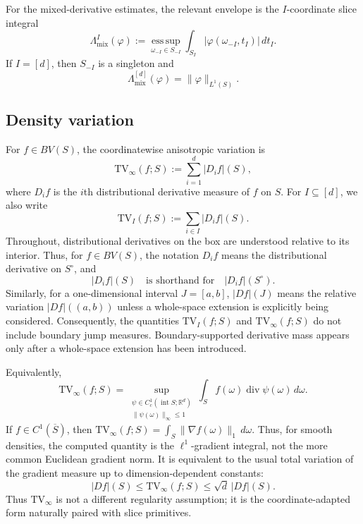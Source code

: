 \documentclass[11pt,letterpaper]{article}
\theoremstyle{definition}
\theoremstyle{remark}
\newcommand{\TV}{\mathrm{TV}}
\begin{document}
For the mixed-derivative estimates, the relevant envelope is the
$I$-coordinate slice integral
$$
\Lambda_{\mathrm{mix}}^I(\varphi)
:=
\operatorname*{ess\,sup}_{\omega_{-I}\in S_{-I}}
\int_{S_I}|\varphi(\omega_{-I},t_I)|\,dt_I .
$$
If $I=[d]$, then $S_{-I}$ is a singleton and
$$
\Lambda_{\mathrm{mix}}^{[d]}(\varphi)=\|\varphi\|_{L^1(S)}.
$$



\subsection{Density variation } 
\label{subsec:density_variation}
  

For $f\in BV(S)$, the coordinatewise anisotropic variation is
\begin{equation}
\label{eq:def_anisotropic_tv}
\TV_\infty(f;S):=\sum_{i=1}^d |D_i f|(S),
\end{equation}
where $D_i f$ is the $i$th distributional derivative measure of $f$ on $S$.
For $I\subseteq[d]$, we also write
$$
\TV_I(f;S):=\sum_{i\in I}|D_i f|(S).
$$
Throughout, distributional derivatives on the box are understood relative to
its interior. Thus, for $f\in BV(S)$, the notation $D_i f$ means the
distributional derivative on $S^\circ$, and
$$
|D_i f|(S)
\quad\text{is shorthand for}\quad
|D_i f|(S^\circ).
$$
Similarly, for a one-dimensional interval $J=[a,b]$,
$|Df|(J)$ means the relative variation $|Df|((a,b))$ unless a whole-space
extension is explicitly being considered. Consequently, the quantities
$\TV_I(f;S)$ and $\TV_\infty(f;S)$ do not include boundary jump measures.
Boundary-supported derivative mass appears only after a whole-space extension
has been introduced.

Equivalently,
$$
\TV_\infty(f;S)
=
\sup_{\substack{\psi\in C_c^1(\operatorname{int}S;\mathbb R^d)\\
\|\psi(\omega)\|_\infty\le1}}
\int_S f(\omega)\operatorname{div}\psi(\omega)\,d\omega .
$$
If $f\in C^1(\overline S)$, then
$\TV_\infty(f;S)=\int_S\|\nabla f(\omega)\|_1\,d\omega$. Thus, for smooth densities, the computed quantity is the $\ell^1$-gradient
integral, not the more common Euclidean gradient norm. It is equivalent to
the usual total variation of the gradient measure up to dimension-dependent
constants:
$$
|Df|(S)\le \TV_\infty(f;S)\le \sqrt d\,|Df|(S).
$$
Thus $\TV_\infty$ is not a different regularity assumption; it is the
coordinate-adapted form naturally paired with slice primitives.
\end{document}

